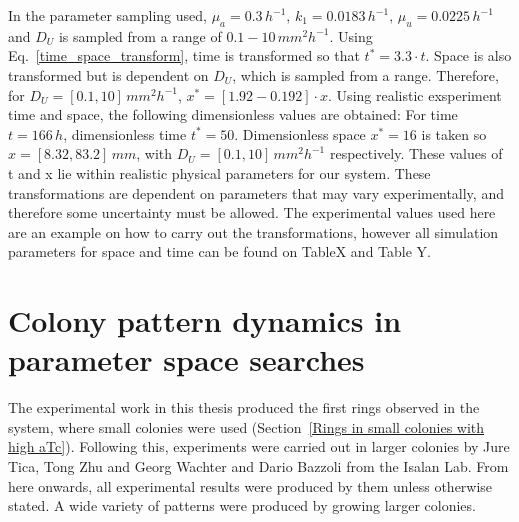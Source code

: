 In the parameter sampling used, $\mu_a = 0.3 \,h^{-1}, \,k_1 = 0.0183 \,h^{-1},\, \mu_u = 0.0225\, h^{-1}$ and $D_U$ is sampled from a range of $0.1-10 \,mm^2h^{-1}$.
Using Eq.~\ref{time_space_transform}, time is transformed so that $t^*=3.3\cdot t$.
Space is also transformed but is dependent on $D_U$, which is sampled from a range.
Therefore, for $D_U = [0.1, 10] \,mm^2 h^{-1}$, $x^* =[1.92 - 0.192] \cdot x$.
Using realistic exsperiment time and space, the following dimensionless values are obtained:
For time $t=166\,h$, dimensionless time $t^*=50$.
Dimensionless space  $x^*=16$ is taken so  $x = [8.32, 83.2] \,mm$, with $D_U = [0.1, 10]\, mm^2 h^{-1}$ respectively.
These values of t and x lie within realistic physical parameters for our system.
These transformations are dependent on parameters that may vary experimentally, and therefore some uncertainty must be allowed.
The experimental values used here are an example on how to carry out the transformations, however all simulation parameters for space and time can be found on TableX and Table Y.
\section{Colony pattern dynamics in parameter space searches}

The experimental work in this thesis produced the first rings observed in the system, where small colonies were used (Section~\ref{Rings in small colonies with high aTc}).
Following this, experiments were carried out in larger colonies by Jure Tica, Tong Zhu and Georg Wachter and Dario Bazzoli from the Isalan Lab.
From here onwards, all experimental results were produced by them unless otherwise stated.
A wide variety of patterns were produced by growing larger colonies.



